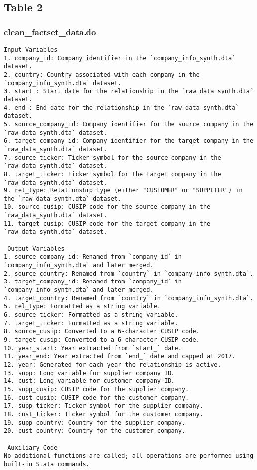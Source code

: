 \documentclass[11pt]{article}
\theoremstyle{definition}
\newcommand{\codepath}{F:/12004835/replication_package_final/replication_package_final}
\begin{document}
	\subsection{Table 2}
	\subsubsection{clean\_factset\_data.do}
	\begin{lstlisting}[style=Matlab]
 Input Variables
1. company_id: Company identifier in the `company_info_synth.dta` dataset.
2. country: Country associated with each company in the `company_info_synth.dta` dataset.
3. start_: Start date for the relationship in the `raw_data_synth.dta` dataset.
4. end_: End date for the relationship in the `raw_data_synth.dta` dataset.
5. source_company_id: Company identifier for the source company in the `raw_data_synth.dta` dataset.
6. target_company_id: Company identifier for the target company in the `raw_data_synth.dta` dataset.
7. source_ticker: Ticker symbol for the source company in the `raw_data_synth.dta` dataset.
8. target_ticker: Ticker symbol for the target company in the `raw_data_synth.dta` dataset.
9. rel_type: Relationship type (either "CUSTOMER" or "SUPPLIER") in the `raw_data_synth.dta` dataset.
10. source_cusip: CUSIP code for the source company in the `raw_data_synth.dta` dataset.
11. target_cusip: CUSIP code for the target company in the `raw_data_synth.dta` dataset.

 Output Variables
1. source_company_id: Renamed from `company_id` in `company_info_synth.dta` and later merged.
2. source_country: Renamed from `country` in `company_info_synth.dta`.
3. target_company_id: Renamed from `company_id` in `company_info_synth.dta` and later merged.
4. target_country: Renamed from `country` in `company_info_synth.dta`.
5. rel_type: Formatted as a string variable.
6. source_ticker: Formatted as a string variable.
7. target_ticker: Formatted as a string variable.
8. source_cusip: Converted to a 6-character CUSIP code.
9. target_cusip: Converted to a 6-character CUSIP code.
10. year_start: Year extracted from `start_` date.
11. year_end: Year extracted from `end_` date and capped at 2017.
12. year: Generated for each year the relationship is active.
13. supp: Long variable for supplier company ID.
14. cust: Long variable for customer company ID.
15. supp_cusip: CUSIP code for the supplier company.
16. cust_cusip: CUSIP code for the customer company.
17. supp_ticker: Ticker symbol for the supplier company.
18. cust_ticker: Ticker symbol for the customer company.
19. supp_country: Country for the supplier company.
20. cust_country: Country for the customer company.

 Auxiliary Code
No additional functions are called; all operations are performed using built-in Stata commands.
	\end{lstlisting}
	
	
\end{document}
